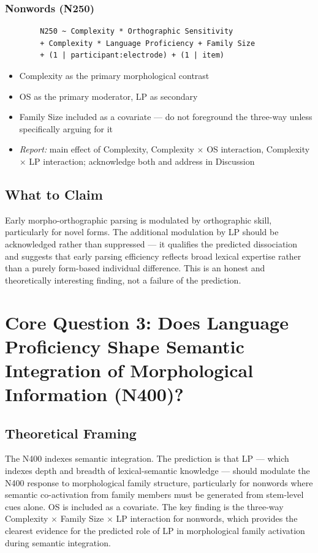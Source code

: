 \documentclass[12pt]{article}
\begin{document}
	\subsubsection{Nonwords (N250)}
	
	\begin{verbatim}
		N250 ~ Complexity * Orthographic Sensitivity
		+ Complexity * Language Proficiency + Family Size
		+ (1 | participant:electrode) + (1 | item)
	\end{verbatim}
	
	\begin{itemize}
		\item Complexity as the primary morphological contrast
		\item OS as the primary moderator, LP as secondary
		\item Family Size included as a covariate --- do not foreground the three-way unless specifically arguing for it
		\item \textit{Report:} main effect of Complexity, Complexity $\times$ OS interaction, Complexity $\times$ LP interaction; acknowledge both and address in Discussion
	\end{itemize}
	
	\subsection{What to Claim}
	
	Early morpho-orthographic parsing is modulated by orthographic skill, particularly for novel forms. The additional modulation by LP should be acknowledged rather than suppressed --- it qualifies the predicted dissociation and suggests that early parsing efficiency reflects broad lexical expertise rather than a purely form-based individual difference. This is an honest and theoretically interesting finding, not a failure of the prediction.
	
	\section{Core Question 3: Does Language Proficiency Shape Semantic Integration of Morphological Information (N400)?}
	
	\subsection{Theoretical Framing}
	
	The N400 indexes semantic integration. The prediction is that LP --- which indexes depth and breadth of lexical-semantic knowledge --- should modulate the N400 response to morphological family structure, particularly for nonwords where semantic co-activation from family members must be generated from stem-level cues alone. OS is included as a covariate. The key finding is the three-way Complexity $\times$ Family Size $\times$ LP interaction for nonwords, which provides the clearest evidence for the predicted role of LP in morphological family activation during semantic integration.
	
\end{document}
